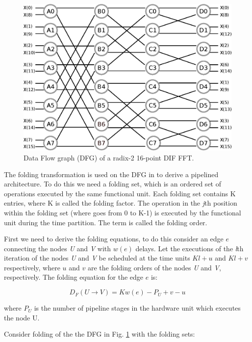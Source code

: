 \documentclass[journal,comsoc]{IEEEtran}
\begin{document}
\begin{figure}[htbp]%
\centering
\includegraphics[width=\linewidth]{Diagramas/Butter16.eps}
\caption{Data Flow graph (DFG) of a radix-2 16-point DIF FFT.}
\label{fig:dfg_16}
\end{figure}

The folding transformation is used on the DFG in to derive a pipelined architecture. To do this we need a folding set, which is an ordered set of operations executed by the same functional unit. Each folding set contains K entries, where K is called the folding factor. The operation in the \textit{j}th position within the folding set (where goes from 0 to K-1) is executed by the functional unit during the time partition. The term is called the folding order.

First we need to derive the folding equations, to do this consider an edge $e$ connecting the nodes \textit{U} and \textit{V} with $w(e)$ delays. Let the executions of the \textit{l}th iteration of the nodes \textit{U} and \textit{V} be scheduled at the time units $Kl+u$ and $Kl+v$ respectively, where $u$ and $v$ are the folding orders of the nodes \textit{U} and \textit{V}, respectively. The folding equation for the edge $e$ is:

\begin{equation}
    D_F(U \to V) = Kw(e)-P_U+v-u
\end{equation}

where $P_U$ is the number of pipeline stages in the hardware unit which executes the node U.

Consider folding of the the DFG in Fig. \ref{fig:dfg_16} with the folding sets:
\end{document}
